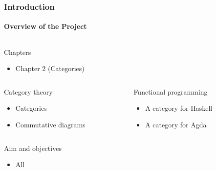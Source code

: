\documentclass{beamer}
\begin{document}
\begin{frame}[label={chap:categories}]
  \frametitle{Introduction}
  \framesubtitle{Overview of the Project}

  \begin{columns}[onlytextwidth,t]
    \begin{column}{\textwidth}
      \begin{block}{Chapters}
        \begin{itemize}
        \item Chapter 2 (Categories)
        \end{itemize}
      \end{block}
    \end{column}
  \end{columns}
  \begin{columns}[onlytextwidth,t]
    \begin{column}{.5\textwidth}
      \begin{block}{Category theory}
        \begin{itemize}
        \item Categories
        \item Commutative diagrams
        \end{itemize}
      \end{block}
    \end{column}
    \begin{column}{.5\textwidth}
      \begin{block}{Functional programming}
        \begin{itemize}
        \item A category for Haskell
        \item A category for Agda
        \end{itemize}
      \end{block}
    \end{column}
  \end{columns}
  \begin{columns}[onlytextwidth,t]
    \begin{column}{\textwidth}
      \begin{block}{Aim and objectives}
        \begin{itemize}
        \item All
        \end{itemize}
      \end{block}
    \end{column}
  \end{columns}

\end{frame}
\end{document}
